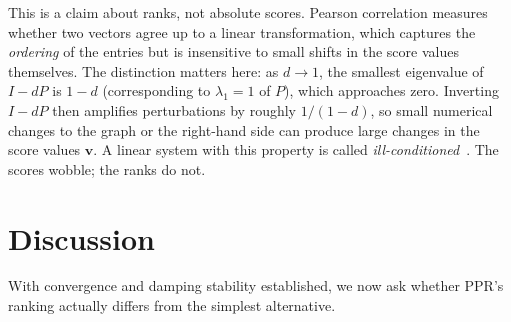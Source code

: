 \documentclass[conference]{IEEEtran}
\begin{document}
This is a claim about ranks, not absolute scores. Pearson
correlation measures whether two vectors agree up to a linear
transformation, which captures the \emph{ordering} of the
entries but is insensitive to small shifts in the score values
themselves. The distinction matters here: as $d \to 1$, the
smallest
eigenvalue of $I - dP$ is $1 - d$ (corresponding to $\lambda_1
= 1$ of $P$), which approaches zero. Inverting $I - dP$ then
amplifies perturbations by roughly $1/(1-d)$, so small
numerical changes to the graph or the right-hand side can
produce large changes in the score values $\mathbf{v}$. A
linear system with this property is called
\emph{ill-conditioned}~\cite{langville2004deeper}. The scores
wobble; the ranks do not.

\section{Discussion}
\label{sec:discussion}

With convergence and damping stability established, we now ask
whether PPR's ranking actually differs from the simplest
alternative.
\end{document}
